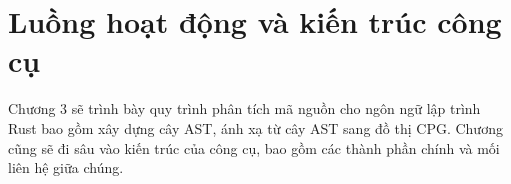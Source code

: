 \chapter{Luồng hoạt động và kiến trúc công cụ}
\label{chap:method}

Chương 3 sẽ trình bày quy trình phân tích mã nguồn cho ngôn ngữ lập trình Rust bao gồm xây dựng cây AST, ánh xạ từ cây AST sang đồ thị CPG.
Chương cũng sẽ đi sâu vào kiến trúc của công cụ, bao gồm các thành phần chính và mối liên hệ giữa chúng.




